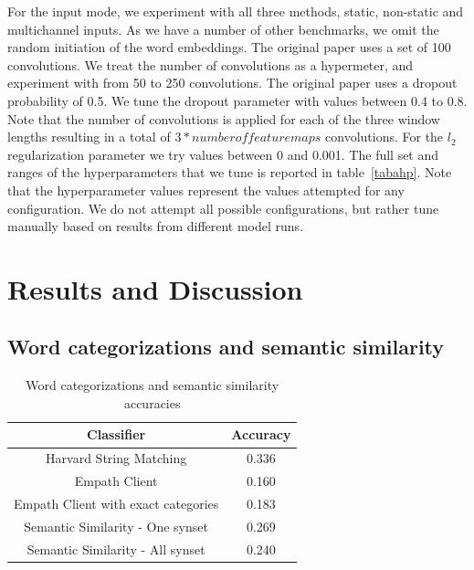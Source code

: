 \documentclass[conference]{IEEEtran}
\begin{document}
For the input mode, we experiment with all three methods, static, non-static and multichannel inputs. As we have a number of other benchmarks, we omit the random initiation of the word embeddings.  The original paper uses a set of 100 convolutions. We treat the number of convolutions as a hypermeter, and experiment with from 50 to 250 convolutions. The original paper uses a dropout probability of 0.5. We tune the dropout parameter with values between 0.4 to 0.8. Note that the number of convolutions is applied for each of the three window lengths resulting in a total of $3 * number of feature maps$ convolutions. For the $l_2$ regularization parameter we try values between 0 and 0.001. The full set and ranges of the hyperparameters that we tune is reported in table~\ref{tabahp}. Note that the hyperparameter values represent the values attempted for any configuration. We do not attempt all possible configurations, but rather tune manually based on results from different model runs.

\section{Results and Discussion}

\subsection{Word categorizations and semantic similarity}

\begin{table}[htbp]
\caption{Word categorizations and semantic similarity accuracies}
\begin{center}
\begin{tabular}{|c|c|}
\hline
\textbf{Classifier}&\multicolumn{1}{|c|}{\textbf{Accuracy}} \\ 

\hline
Harvard String Matching & 0.336 \\ 
\hline
Empath Client & 0.160 \\ 
\hline
Empath Client with exact categories & 0.183 \\ 
\hline
Semantic Similarity - One synset & 0.269 \\ 
\hline
Semantic Similarity - All synset & 0.240 \\ 
\hline
\end{tabular}
\label{tab1}
\end{center}
\end{table}
\end{document}
